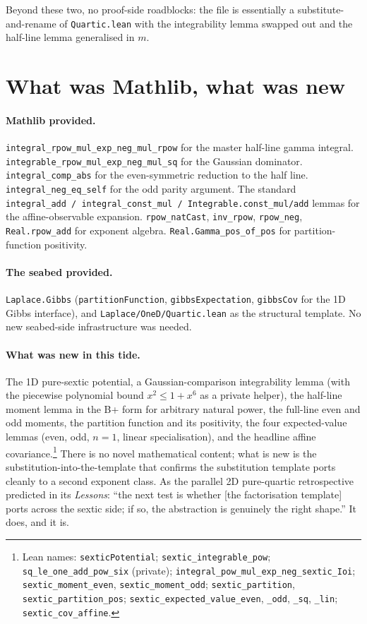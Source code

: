 \documentclass[11pt]{article}
\begin{document}
Beyond these two, no proof-side roadblocks: the file is essentially a
substitute-and-rename of \texttt{Quartic.lean} with the integrability lemma
swapped out and the half-line lemma generalised in $m$.

\section{What was Mathlib, what was new}

\paragraph{Mathlib provided.}
\texttt{integral\_rpow\_mul\_exp\_neg\_mul\_rpow} for the master half-line
gamma integral. \texttt{integrable\_rpow\_mul\_exp\_neg\_mul\_sq} for the
Gaussian dominator. \texttt{integral\_comp\_abs} for the
even-symmetric reduction to the half line. \texttt{integral\_neg\_eq\_self}
for the odd parity argument. The standard
\texttt{integral\_add\,/\,integral\_const\_mul\,/\,Integrable.const\_mul/add}
lemmas for the affine-observable expansion. \texttt{rpow\_natCast},
\texttt{inv\_rpow}, \texttt{rpow\_neg}, \texttt{Real.rpow\_add} for exponent
algebra. \texttt{Real.Gamma\_pos\_of\_pos} for partition-function positivity.

\paragraph{The seabed provided.}
\texttt{Laplace.Gibbs} (\texttt{partitionFunction}, \texttt{gibbsExpectation},
\texttt{gibbsCov} for the 1D Gibbs interface), and
\texttt{Laplace/OneD/Quartic.lean} as the structural template. No new
seabed-side infrastructure was needed.

\paragraph{What was new in this tide.}
The 1D pure-sextic potential, a Gaussian-comparison integrability lemma
(with the piecewise polynomial bound $x^2 \leq 1 + x^6$ as a private
helper), the half-line moment lemma in the B+ form for arbitrary natural
power, the full-line even and odd moments, the partition function and its
positivity, the four expected-value lemmas (even, odd, $n=1$, linear
specialisation), and the headline affine
covariance.\footnote{Lean names: \texttt{sexticPotential};
\texttt{sextic\_integrable\_pow}; \texttt{sq\_le\_one\_add\_pow\_six} (private);
\texttt{integral\_pow\_mul\_exp\_neg\_sextic\_Ioi};
\texttt{sextic\_moment\_even}, \texttt{sextic\_moment\_odd};
\texttt{sextic\_partition}, \texttt{sextic\_partition\_pos};
\texttt{sextic\_expected\_value\_even}, \texttt{\_odd},
\texttt{\_sq}, \texttt{\_lin};
\texttt{sextic\_cov\_affine}.}
There is no novel mathematical content; what is new is the
substitution-into-the-template that confirms the substitution template
ports cleanly to a second exponent class. As the parallel 2D pure-quartic
retrospective predicted in its \emph{Lessons}: ``the next test is whether
[the factorisation template] ports across the sextic side; if so, the
abstraction is genuinely the right shape.'' It does, and it is.
\end{document}

